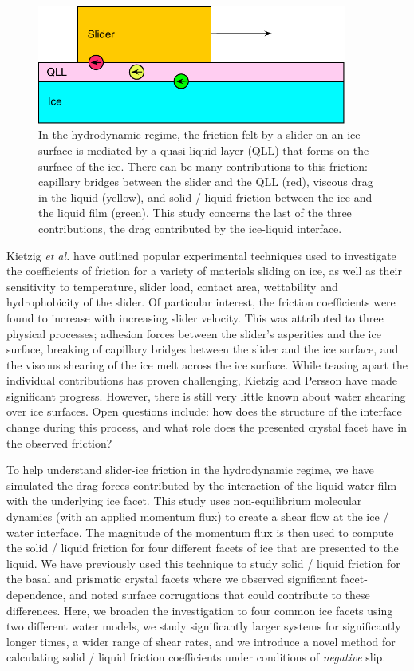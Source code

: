 \begin{figure}
\includegraphics[width=4in]{Figures/QLLsketch}
\caption{\label{fig:QLLsketch} In the hydrodynamic regime, the
  friction felt by a slider on an ice surface is mediated by a
  quasi-liquid layer (QLL) that forms on the surface of the ice.
  There can be many contributions to this friction: capillary bridges
  between the slider and the QLL (red), viscous drag in the liquid
  (yellow), and solid / liquid friction between the ice and the liquid
  film (green). This study concerns the last of the three
  contributions, the drag contributed by the ice-liquid interface.}
\end{figure}

Kietzig \textit{et al.} have outlined popular experimental techniques
used to investigate the coefficients of friction for a variety of
materials sliding on ice, as well as their sensitivity to temperature,
slider load, contact area, wettability and hydrophobicity of the
slider.\cite{Kietzig2010} Of particular interest, the friction
coefficients were found to increase with increasing slider
velocity. This was attributed to three physical processes; adhesion
forces between the slider's asperities and the ice surface, breaking
of capillary bridges between the slider and the ice surface, and the
viscous shearing of the ice melt across the ice surface. While teasing
apart the individual contributions has proven challenging,
Kietzig\cite{Kietzig2009} and Persson\cite{Persson2015,Tuononen2016}
have made significant progress. However, there is still very little
known about water shearing over ice surfaces. Open questions include:
how does the structure of the interface change during this process,
and what role does the presented crystal facet have in the observed
friction?

To help understand slider-ice friction in the hydrodynamic regime, we
have simulated the drag forces contributed by the interaction of the
liquid water film with the underlying ice facet. This study uses
non-equilibrium molecular dynamics (with an applied momentum flux) to
create a shear flow at the ice / water interface. The magnitude of the
momentum flux is then used to compute the solid / liquid friction for
four different facets of ice that are presented to the liquid.  We
have previously used this technique to study solid / liquid friction
for the basal and prismatic crystal facets where we observed
significant facet-dependence, and noted surface corrugations that
could contribute to these differences.\cite{Louden2013a} Here, we
broaden the investigation to four common ice facets using two
different water models, we study significantly larger systems for
significantly longer times, a wider range of shear rates, and we
introduce a novel method for calculating solid / liquid friction
coefficients under conditions of \textit{negative} slip.

